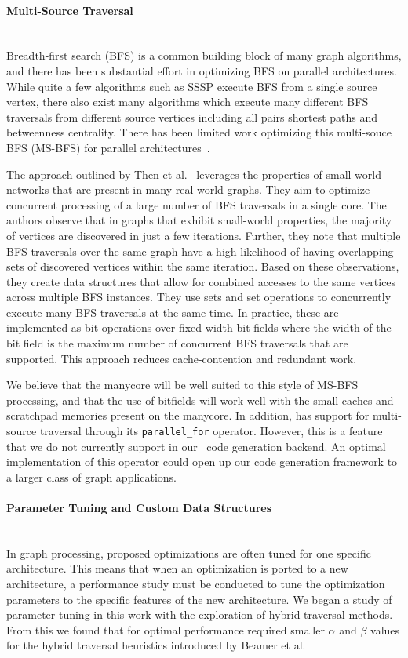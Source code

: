 \paragraph{Multi-Source Traversal}\mbox{}\\
Breadth-first search (BFS) is a common building block of many graph algorithms, and there has been substantial effort in optimizing BFS on parallel architectures. 
While quite a few algorithms such as SSSP execute BFS from a single source vertex, there also exist many algorithms which execute many different BFS traversals from different source vertices including all pairs shortest paths and betweenness centrality.
There has been limited work optimizing this multi-souce BFS (MS-BFS) for parallel architectures~\cite{then2014more, liu2016ibfs}.

The approach outlined by Then et al.~\cite{then2014more} leverages the properties of small-world networks that are present in many real-world graphs.
They aim to optimize concurrent processing of a large number of BFS traversals in a single core.
The authors observe that in graphs that exhibit small-world properties, the majority of vertices are discovered in just a few iterations.
Further, they note that multiple BFS traversals over the same graph have a high likelihood of having overlapping sets of discovered vertices within the same iteration.
Based on these observations, they create data structures that allow for combined accesses to the same vertices across multiple BFS instances.
They use sets and set operations to concurrently execute many BFS traversals at the same time. 
In practice, these are implemented as bit operations over fixed width bit fields where the width of the bit field is the maximum number of concurrent BFS traversals that are supported.
This approach reduces cache-contention and redundant work.

We believe that the manycore will be well suited to this style of MS-BFS processing, and that the use of bitfields will work well with the small caches and scratchpad memories present on the manycore.
In addition, \graphit has support for multi-source traversal through its \lstinline{parallel_for} operator. 
However, this is a feature that we do not currently support in our \hb~code generation backend. 
An optimal implementation of this operator could open up our code generation framework to a larger class of graph applications.

\paragraph{Parameter Tuning and Custom Data Structures}\mbox{}\\
In graph processing, proposed optimizations are often tuned for one specific architecture.
This means that when an optimization is ported to a new architecture, a performance study must be conducted to tune the optimization parameters to the specific features of the new architecture.
We began a study of parameter tuning in this work with the exploration of hybrid traversal methods. 
From this we found that for optimal performance \hb required smaller $\alpha$ and $\beta$ values for the hybrid traversal heuristics introduced by Beamer et al.

